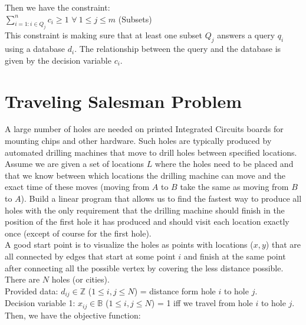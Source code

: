 \documentclass[11pt, oneside]{article}   	%
\begin{document}
Then we have the constraint:\\

$\sum_{i = 1 : i \in Q_j}^{n} c_i \geq 1$ \hspace{5 mm} $\forall{}\ 1 \leq j \leq m$ (Subsets)\\

This constraint is making sure that at least one subset $Q_j$ answers a query $q_i$ using a database $d_i$. The relationship between the query and the database is given by the decision variable $c_i$.

\section{Traveling Salesman Problem}

A large number of holes are needed on printed Integrated Circuits boards for mounting chips and other hardware. Such holes are typically produced by automated drilling machines that move to drill holes between specified locations. Assume we are given a set of locations $L$ where the holes need to be placed and that we know between which locations the drilling machine can move and the exact time of these moves (moving from $A$ to $B$ take the same as moving from $B$ to $A$). Build a linear program that allows us to find the fastest way to produce all holes with the only requirement that the drilling machine should finish in the position of the first hole it has produced and should visit each location exactly once (except of course for the first hole).\\

A good start point is to visualize the holes as points with locations ($x,y$) that are all connected by edges that start at some point $i$ and finish at the same point after connecting all the possible vertex by covering the less distance possible.\\

There are $N$ holes (or cities).\\

Provided data: $d_{ij} \in \mathbb{Z}$ ($1 \leq i,j \leq N$) = distance form hole $i$ to hole $j$.\\

Decision variable 1: $x_{ij} \in \mathbb{B}$ ($1 \leq i,j \leq N$) = 1 iff we travel from hole $i$ to hole $j$.\\

Then, we have the objective function:\\
\end{document}
